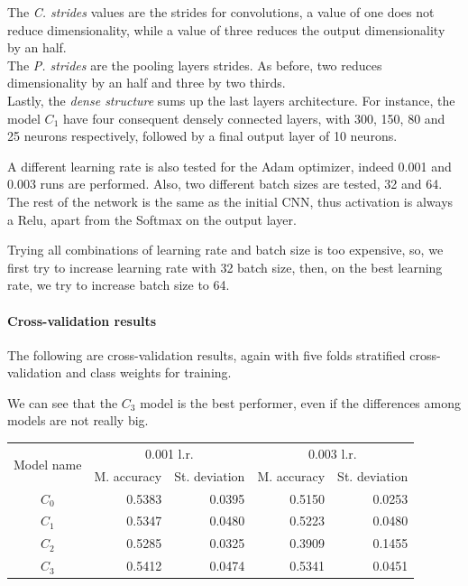 The \emph{C. strides} values are the strides for convolutions, a value of one does not 
reduce dimensionality, while a value of three reduces the output dimensionality by an  half.\\
The \emph{P. strides} are the pooling layers strides. As before, two reduces dimensionality 
by an half and three by two thirds.\\
Lastly, the \emph{dense structure} sums up the last layers architecture. For instance, 
the model $C_1$ have four consequent densely connected layers, with 300, 150, 80 and 
25 neurons respectively, followed by a final output layer of 10 neurons.

A different learning rate is also tested for the Adam optimizer, 
indeed 0.001 and 0.003 runs are performed.
Also, two different batch sizes are tested, 32 and 64.
The rest of the network is the same as the initial CNN, thus activation is always a Relu, 
apart from the Softmax on the output layer. 

Trying all combinations of learning rate and batch size is too expensive, so, 
we first try to increase learning rate with 32 batch size, then, on the best learning rate, 
we try to increase batch size to 64.

\paragraph{Cross-validation results}
The following are cross-validation results, again with five folds stratified cross-validation 
and class weights for training.

We can see that the $C_3$ model is the best performer, even if the differences among models are not really big.
\begin{center}
    \begin{tabular}{ |c|r|r|r|r| } 
        \hline
        \multirow{2}{*}{Model name} & \multicolumn{2}{c|}{0.001 l.r.} & \multicolumn{2}{c|}{0.003 l.r.}  \\
        \cline{2-5}
        & M. accuracy & St. deviation & M. accuracy & St. deviation \\
        \hline
        $C_0$ & 0.5383 & 0.0395 & 0.5150 & 0.0253 \\
        $C_1$ & 0.5347 & 0.0480 & 0.5223 & 0.0480 \\
        $C_2$ & 0.5285 & 0.0325 & 0.3909 & 0.1455 \\
        $C_3$ & 0.5412 & 0.0474 & 0.5341 & 0.0451 \\
        \hline
    \end{tabular}
\end{center}


